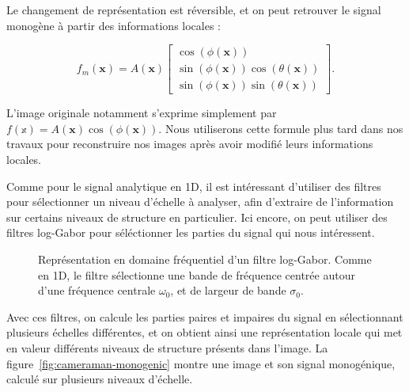 Le changement de représentation est réversible, et on peut retrouver le signal monogène à partir des informations locales :

\begin{equation}
    f_m(\mathbf{x}) = A(\mathbf{x})\left[
        \begin{array}{c}
        \cos(\phi(\mathbf{x})) \\
        \sin(\phi(\mathbf{x}))\cos(\theta(\mathbf{x})) \\
        \sin(\phi(\mathbf{x}))\sin(\theta(\mathbf{x}))
        \end{array}
    \right].
\end{equation}

L'image originale notamment s'exprime simplement par $f(\mathbb{x}) = A(\mathbf{x})\cos(\phi(\mathbf{x}))$. Nous utiliserons cette formule plus tard dans nos travaux pour reconstruire nos images après avoir modifié leurs informations locales.

\bigskip

Comme pour le signal analytique en 1D, il est intéressant d'utiliser des filtres pour sélectionner un niveau d'échelle à analyser, afin d'extraire de l'information sur certains niveaux de structure en particulier. Ici encore, on peut utiliser des filtres log-Gabor pour séléctionner les parties du signal qui nous intéressent.

\begin{figure}
    \centering

    \caption[Filtre log-Gabor en 2D]{Représentation en domaine fréquentiel d'un filtre log-Gabor. Comme en 1D, le filtre sélectionne une bande de fréquence centrée autour d'une fréquence centrale $\omega_0$, et de largeur de bande $\sigma_0$.}
    \label{fig:2D-log-gabor}
\end{figure}

Avec ces filtres, on calcule les parties paires et impaires du signal en sélectionnant plusieurs échelles différentes, et on obtient ainsi une représentation locale qui met en valeur différents niveaux de structure présents dans l'image. La figure~\ref{fig:cameraman-monogenic} montre une image et son signal monogénique, calculé sur plusieurs niveaux d'échelle.

